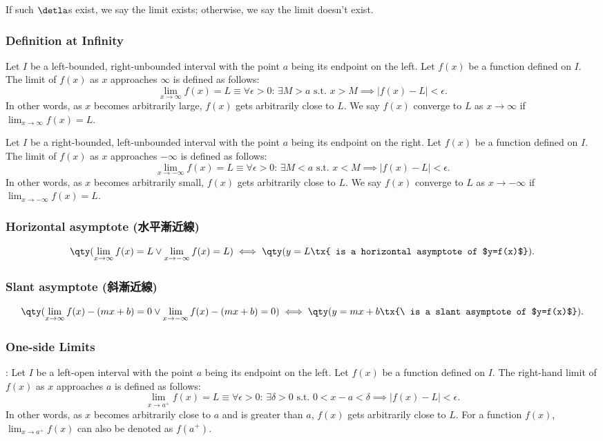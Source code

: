 \documentclass[a4paper,12pt]{report}
\begin{document}
If such $\detla$s exist, we say the limit exists; otherwise, we say the limit doesn't exist.
\subsubsection{Definition at Infinity}
Let \(I\) be a left-bounded, right-unbounded interval with the point \(a\) being its endpoint on the left. Let \( f(x) \) be a function defined on \(I\). The limit of \( f(x) \) as \( x \) approaches \( \infty \) is defined as follows:
\[\lim_{x \to \infty} f(x) = L \equiv \forall \epsilon > 0: \, \exists M > a \text{\ s.t.\ } x > M \implies |f(x) - L| < \epsilon.\]
In other words, as \(x\) becomes arbitrarily large, \(f(x)\) gets arbitrarily close to \(L\). We say $f(x)$ converge to $L$ as $x\to\infty$ if $\lim_{x \to \infty} f(x) = L$.

Let \(I\) be a right-bounded, left-unbounded interval with the point \(a\) being its endpoint on the right. Let \( f(x) \) be a function defined on \(I\). The limit of \( f(x) \) as \( x \) approaches \( -\infty \) is defined as follows:
\[\lim_{x \to -\infty} f(x) = L \equiv \forall \epsilon > 0: \, \exists M < a \text{\ s.t.\ } x < M \implies |f(x) - L| < \epsilon.\]
In other words, as \(x\) becomes arbitrarily small, \(f(x)\) gets arbitrarily close to \(L\). We say $f(x)$ converge to $L$ as $x\to-\infty$ if $\lim_{x \to -\infty} f(x) = L$.
\subsubsection{Horizontal asymptote (水平漸近線)}
\[ \qty(\lim_{x \to \infty} f(x)=L \lor\lim_{x \to -\infty} f(x)=L) \iff \qty(y=L\tx{ is a horizontal asymptote of $y=f(x)$}).\]
\subsubsection{Slant asymptote (斜漸近線)}
\[ \qty(\lim_{x \to \infty} f(x)-(mx+b)=0 \lor\lim_{x \to -\infty} f(x)-(mx+b)=0) \iff \qty(y=mx+b\tx{\ is a slant asymptote of $y=f(x)$}).\]
\subsubsection{One-side Limits}
: Let \(I\) be a left-open interval with the point \(a\) being its endpoint on the left. Let \( f(x) \) be a function defined on \(I\). The right-hand limit of \( f(x) \) as \( x \) approaches \( a \) is defined as follows:
\[\lim_{x \to a^+} f(x) = L \equiv \forall \epsilon > 0 :\,\exists \delta > 0 \text{\ s.t.\ } 0 < x - a < \delta \implies |f(x) - L| < \epsilon.\]
In other words, as \(x\) becomes arbitrarily close to \(a\) and is greater than \(a\), \(f(x)\) gets arbitrarily close to \(L\). For a function $f(x)$, $\lim_{x\to a^+}f(x)$ can also be denoted as $f(a^+)$.
\end{document}
